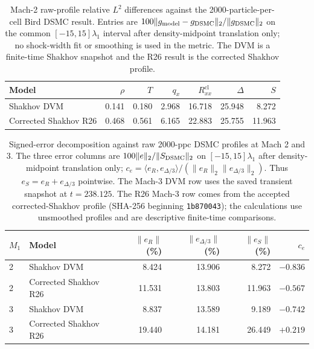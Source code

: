 \documentclass[lineno,paper]{JFM-FLM_Au}
\newcommand{\revisionbox}[1]{\colorbox{revisionyellow}{#1}}
\newcommand{\revisionbox}[1]{#1}
\newcommand{\cl}{\mathrm{cl}}
\begin{document}
\begin{table}
\centering
\revisionbox{\begin{minipage}{0.90\linewidth}\captionsetup{width=\linewidth}\caption{Mach-2 raw-profile relative $L^2$ differences against the 2000-particle-per-cell Bird DSMC result. Entries are $100\|g_{\rm model}-g_{\rm DSMC}\|_2/\|g_{\rm DSMC}\|_2$ on the common $[-15,15]\lambda_1$ interval after density-midpoint translation only; no shock-width fit or smoothing is used in the metric. The DVM is a finite-time Shakhov snapshot and the R26 result is the corrected Shakhov profile.}
\label{tab:dsmc2000_m2}\end{minipage}}\par
\small
\begin{tabular}{lrrrrrr}
\toprule
Model & $\rho$ & $T$ & $q_x$ & $R^{\cl}_{xx}$ & $\Delta$ & $S$\\
\midrule
Shakhov DVM & 0.141 & 0.180 & 2.968 & 16.718 & 25.948 & 8.272\\
Corrected Shakhov R26 & 0.468 & 0.561 & 6.165 & 22.883 & 25.755 & 11.963\\
\bottomrule
\end{tabular}
\end{table}

\begin{table}
\centering
\revisionbox{\begin{minipage}{0.90\linewidth}\captionsetup{width=\linewidth}\caption{Signed-error decomposition against raw 2000-ppc DSMC profiles at Mach 2 and 3. The three error columns are $100\|e\|_2/\|S_{\rm DSMC}\|_2$ on $[-15,15]\lambda_1$ after density-midpoint translation only; $c_e=\langle e_R,e_{\Delta/3}\rangle/(\|e_R\|_2\|e_{\Delta/3}\|_2)$. Thus $e_S=e_R+e_{\Delta/3}$ pointwise. The Mach-3 DVM row uses the saved transient snapshot at $t=238.125$. The R26 Mach-3 row comes from the accepted corrected-Shakhov profile (SHA-256 beginning \texttt{1b870043}); the calculations use unsmoothed profiles and are descriptive finite-time comparisons.}
\label{tab:dsmc2000_channel}\end{minipage}}\par
\small
\begin{tabular}{llrrrr}
\toprule
$M_1$ & Model & $\|e_R\|$ (\%) & $\|e_{\Delta/3}\|$ (\%) & $\|e_S\|$ (\%) & $c_e$\\
\midrule
2 & Shakhov DVM & 8.424 & 13.906 & 8.272 & $-0.836$\\
2 & Corrected Shakhov R26 & 11.531 & 13.803 & 11.963 & $-0.567$\\
3 & Shakhov DVM & 8.837 & 13.589 & 9.189 & $-0.742$\\
3 & Corrected Shakhov R26 & 19.440 & 14.181 & 26.449 & $+0.219$\\
\bottomrule
\end{tabular}
\end{table}
\end{document}
